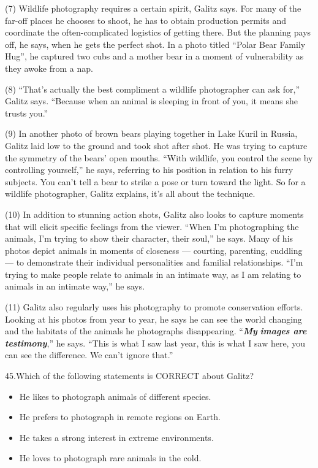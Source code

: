 \documentclass[UTF8,11pt]{ctexart}
\begin{document}
(7) Wildlife photography requires a certain spirit, Galitz says. For many of the far-off places he chooses to shoot, he has to obtain production permits and coordinate the often-complicated logistics of getting there. But the planning pays off, he says, when he gets the perfect shot. In a photo titled “Polar Bear Family Hug”, he captured two cubs and a mother bear in a moment of vulnerability as they awoke from a nap.


(8) “That’s actually the best compliment a wildlife photographer can ask for,” Galitz says. “Because when an animal is sleeping in front of you, it means she trusts you.”


(9) In another photo of brown bears playing together in Lake Kuril in Russia, Galitz laid low to the ground and took shot after shot. He was trying to capture the symmetry of the bears’ open mouths. “With wildlife, you control the scene by controlling yourself,” he says, referring to his position in relation to his furry subjects. You can’t tell a bear to strike a pose or turn toward the light. So for a wildlife photographer, Galitz explains, it’s all about the technique.


(10) In addition to stunning action shots, Galitz also looks to capture moments that will elicit specific feelings from the viewer. “When I’m photographing the animals, I’m trying to show their character, their soul,” he says. Many of his photos depict animals in moments of closeness — courting, parenting, cuddling — to demonstrate their individual personalities and familial relationships. “I’m trying to make people relate to animals in an intimate way, as I am relating to animals in an intimate way,” he says.


(11) Galitz also regularly uses his photography to promote conservation efforts. Looking at his photos from year to year, he says he can see the world changing and the habitats of the animals he photographs disappearing. “\textbf{\textit{My}} \textbf{\textit{images are testimony}},” he says. “This is what I saw last year, this is what I saw here, you can see the difference. We can’t ignore that.”


45.Which of the following statements is CORRECT about Galitz?


\begin{itemize}[leftmargin=2em,itemsep=.2em,topsep=.4em]\item[A.] He likes to photograph animals of different species.
\item[B.] He prefers to photograph in remote regions on Earth.
\item[C.] He takes a strong interest in extreme environments.
\item[D.] He loves to photograph rare animals in the cold.
\end{itemize}
\end{document}

